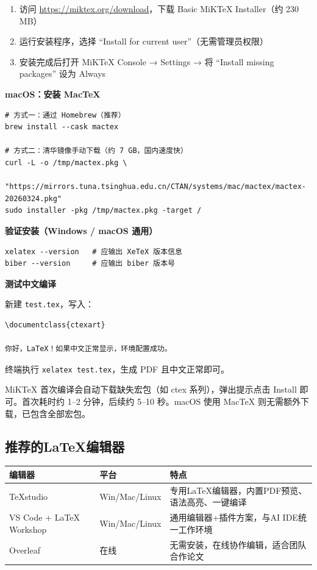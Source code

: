 \begin{enumerate}[leftmargin=2em]
  \item 访问 \url{https://miktex.org/download}，下载 Basic MiKTeX Installer（约 230 MB）
  \item 运行安装程序，选择 ``Install for current user''（无需管理员权限）
  \item 安装完成后打开 MiKTeX Console → Settings → 将 ``Install missing packages'' 设为 Always
\end{enumerate}

\textbf{macOS：安装 MacTeX}

\begin{lstlisting}[style=shell]
# 方式一：通过 Homebrew（推荐）
brew install --cask mactex

# 方式二：清华镜像手动下载（约 7 GB，国内速度快）
curl -L -o /tmp/mactex.pkg \
  "https://mirrors.tuna.tsinghua.edu.cn/CTAN/systems/mac/mactex/mactex-20260324.pkg"
sudo installer -pkg /tmp/mactex.pkg -target /
\end{lstlisting}

\textbf{验证安装（Windows / macOS 通用）}

\begin{lstlisting}[style=shell]
xelatex --version   # 应输出 XeTeX 版本信息
biber --version     # 应输出 biber 版本号
\end{lstlisting}

\textbf{测试中文编译}

新建 \texttt{test.tex}，写入：

\begin{lstlisting}
\documentclass{ctexart}

你好，LaTeX！如果中文正常显示，环境配置成功。

\end{lstlisting}

终端执行 \texttt{xelatex test.tex}，生成 PDF 且中文正常即可。

\begin{notebox}[首次编译提示]
MiKTeX 首次编译会自动下载缺失宏包（如 ctex 系列），弹出提示点击 Install 即可。首次耗时约 1--2 分钟，后续约 5--10 秒。macOS 使用 MacTeX 则无需额外下载，已包含全部宏包。
\end{notebox}

\subsection{推荐的LaTeX编辑器}

\begin{table}[H]
\centering
\begin{tabular}{llp{5cm}}
\toprule
\textbf{编辑器} & \textbf{平台} & \textbf{特点} \\
\midrule
TeXstudio & Win/Mac/Linux & 专用LaTeX编辑器，内置PDF预览、语法高亮、一键编译 \\
VS Code + LaTeX Workshop & Win/Mac/Linux & 通用编辑器+插件方案，与AI IDE统一工作环境 \\
Overleaf & 在线 & 无需安装，在线协作编辑，适合团队合作论文 \\
\bottomrule
\end{tabular}
\end{table}


